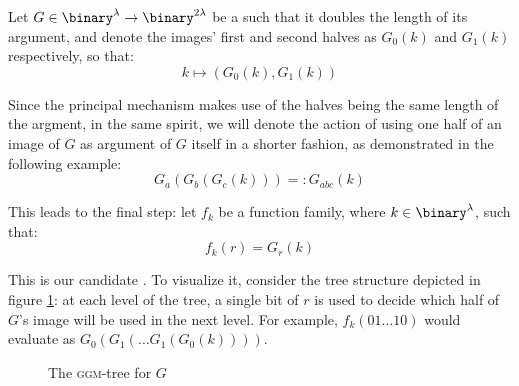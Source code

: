 \begin{construction}
    Let $G \in \binary^\lambda \to \binary^{2\lambda}$ be a \prg{} such that it doubles the length of its argument, and denote the images' first and second halves as $G_0(k)$ and $G_1(k)$ respectively, so that: 
    \[
        k \mapsto (G_0(k), G_1(k))
    \]

    Since the principal mechanism makes use of the halves being the same length of the argment, in the same spirit, we will denote the action of using one half of an image of $G$ as argument of $G$ itself in a shorter fashion, as demonstrated in the following example:
    \[
        G_a(G_b(G_c(k))) =: G_{abc}(k)
    \]

    This leads to the final step: let $f_k$ be a function family, where $k \in \binary^\lambda$, such that:
    \[
        f_k(r) = G_r(k)
    \]

    This is our candidate \prf. To visualize it, consider the tree structure depicted in figure \ref{fig:ggmtree}: at each level of the tree, a single bit of $r$ is used to decide which half of $G$'s image will be used in the next level. For example, $f_k(01 \dots 10)$ would evaluate as $G_0(G_1( \dots G_1(G_0(k))))$.

    \begin{figure}[ht]
        \centering
        \caption{The \textsc{ggm}-tree for $G$}
        \label{fig:ggmtree}
    \end{figure}

\end{construction}
